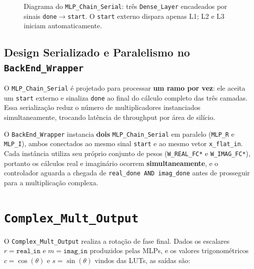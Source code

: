 \documentclass[a4paper,12pt]{article}
\begin{document}
\begin{figure}[H]
{%
}
\caption{Diagrama do \texttt{MLP\_Chain\_Serial}: tr\^es \texttt{Dense\_Layer} encadeados por sinais \texttt{done}$\to$\texttt{start}. O \texttt{start} externo dispara apenas L1; L2 e L3 iniciam automaticamente.}
\label{fig:mlp_chain}
\end{figure}

\subsection{Design Serializado e Paralelismo no \texttt{BackEnd\_Wrapper}}

O \texttt{MLP\_Chain\_Serial} \'e projetado para processar \textbf{um ramo por vez}: ele aceita um \texttt{start} externo e sinaliza \texttt{done} ao final do c\'alculo completo das tr\^es camadas. Essa serializa\c{c}\~ao reduz o n\'umero de multiplicadores instanciados simultaneamente, trocando lat\^encia de throughput por \'area de silício.

O \texttt{BackEnd\_Wrapper} instancia \textbf{dois} \texttt{MLP\_Chain\_Serial} em paralelo (\texttt{MLP\_R} e \texttt{MLP\_I}), ambos conectados ao mesmo sinal \texttt{start} e ao mesmo vetor \texttt{x\_flat\_in}. Cada inst\^ancia utiliza seu pr\'oprio conjunto de pesos (\texttt{W\_REAL\_FC*} e \texttt{W\_IMAG\_FC*}), portanto os c\'alculos real e imagin\'ario ocorrem \textbf{simultaneamente}, e o controlador aguarda a chegada de \texttt{real\_done AND imag\_done} antes de prosseguir para a multiplica\c{c}\~ao complexa.


\section{\texttt{Complex\_Mult\_Output}}

O \texttt{Complex\_Mult\_Output} realiza a rota\c{c}\~ao de fase final. Dados os escalares $r = \texttt{real\_in}$ e $m = \texttt{imag\_in}$ produzidos pelas MLPs, e os valores trigonom\'etricos $c = \cos(\theta)$ e $s = \sin(\theta)$ vindos das LUTs, as sa\'idas s\~ao:
\end{document}
